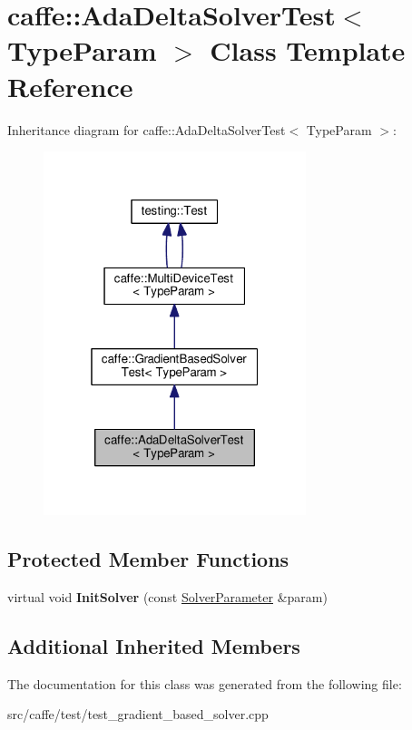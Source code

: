 \hypertarget{classcaffe_1_1_ada_delta_solver_test}{}\section{caffe\+:\+:Ada\+Delta\+Solver\+Test$<$ Type\+Param $>$ Class Template Reference}
\label{classcaffe_1_1_ada_delta_solver_test}


Inheritance diagram for caffe\+:\+:Ada\+Delta\+Solver\+Test$<$ Type\+Param $>$\+:
\nopagebreak
\begin{figure}[H]
\begin{center}
\leavevmode
\includegraphics[width=217pt]{classcaffe_1_1_ada_delta_solver_test__inherit__graph}
\end{center}
\end{figure}
\subsection*{Protected Member Functions}
\begin{DoxyCompactItemize}
\item 
\mbox{\label{classcaffe_1_1_ada_delta_solver_test_a1ba4566f9b5a7a299b7470f13d4bb0f0}} 
virtual void {\bfseries Init\+Solver} (const \mbox{\hyperlink{classcaffe_1_1_solver_parameter}{Solver\+Parameter}} \&param)
\end{DoxyCompactItemize}
\subsection*{Additional Inherited Members}


The documentation for this class was generated from the following file\+:\begin{DoxyCompactItemize}
\item 
src/caffe/test/test\+\_\+gradient\+\_\+based\+\_\+solver.\+cpp\end{DoxyCompactItemize}
